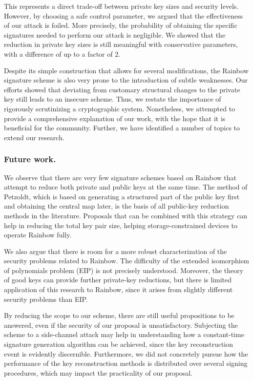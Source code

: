 \documentclass[12pt, a4paper, oneside]{memoir}
\theoremstyle{definition}
\begin{document}
This represents a direct trade-off between private key sizes and security levels. However, by choosing a safe control parameter, we argued that the effectiveness of our attack is foiled. More precisely, the probability of obtaining the specific signatures needed to perform our attack is negligible. We showed that the reduction in private key sizes is still meaningful with conservative parameters, with a difference of up to a factor of 2.

Despite its simple construction that allows for several modifications, the Rainbow signature scheme is also very prone to the introduction of subtle weaknesses. Our efforts showed that deviating from customary structural changes to the private key still leads to an insecure scheme. Thus, we restate the importance of rigorously scrutinizing a cryptographic system. Nonetheless, we attempted to provide a comprehensive explanation of our work, with the hope that it is beneficial for the community. Further, we have identified a number of topics to extend our research. 

\subsubsection{Future work.}

We observe that there are very few signature schemes based on Rainbow that attempt to reduce both private and public keys at the same time. The method of Petzoldt, which is based on generating a structured part of the public key first and obtaining the central map later, is the basis of all public-key reduction methods in the literature. Proposals that can be combined with this strategy can help in reducing the total key pair size, helping storage-constrained devices to operate Rainbow fully.

We also argue that there is room for a more robust characterization of the security problems related to Rainbow. The difficulty of the extended isomorphism of polynomials problem (EIP) is not precisely understood. Moreover, the theory of good keys can provide further private-key reductions, but there is limited application of this research to Rainbow, since it arises from slightly different security problems than EIP. 

By reducing the scope to our scheme, there are still useful propositions to be answered, even if the security of our proposal is unsatisfactory. Subjecting the scheme to a side-channel attack may help in understanding how a constant-time signature generation algorithm can be achieved, since the key reconstruction event is evidently discernible. Furthermore, we did not concretely pursue how the performance of the key reconstruction methods is distributed over several signing procedures, which may impact the practicality of our proposal.
\end{document}
